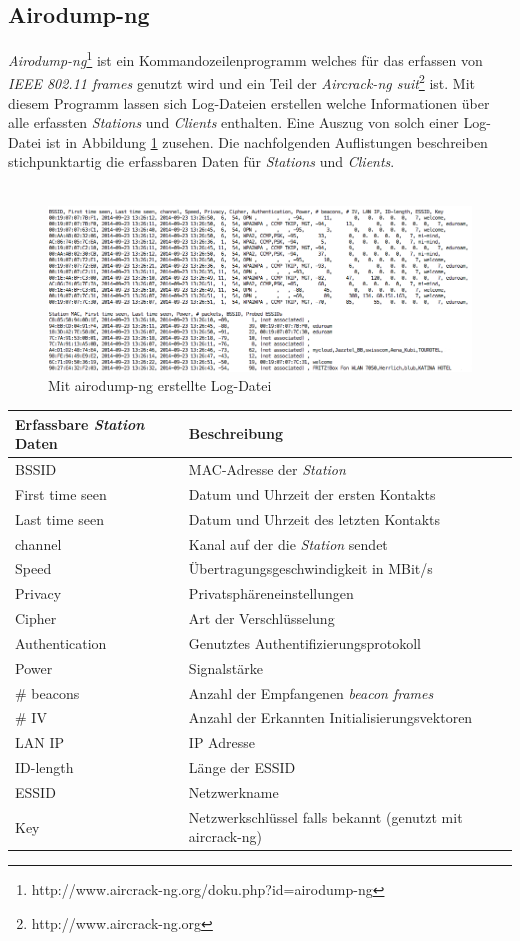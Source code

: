 \documentclass[]{report}
\begin{document}
\subsection{Airodump-ng}\label{lab:airodump-ng}
\textit{Airodump-ng}\footnote{http://www.aircrack-ng.org/doku.php?id=airodump-ng} ist ein Kommandozeilenprogramm welches für das erfassen von \textit{IEEE 802.11 frames} genutzt wird und ein Teil der \textit{Aircrack-ng suit}\footnote{http://www.aircrack-ng.org} ist. Mit diesem Programm lassen sich Log-Dateien erstellen welche Informationen über alle erfassten \textit{Stations} und \textit{Clients} enthalten. Eine Auszug von solch einer Log-Datei ist in Abbildung \ref{fig:log_file} zusehen. Die nachfolgenden Auflistungen beschreiben stichpunktartig die erfassbaren Daten für \textit{Stations} und \textit{Clients}.\\ \\
\begin{figure}
    \centering
    \includegraphics[width=5.0in]{bilder/log.png}
    \caption{Mit airodump-ng erstellte Log-Datei}
    \label{fig:log_file}
\end{figure}
\begin{center}
  \begin{tabulary}{\textwidth}{l | L}
\toprule
Erfassbare \textit{Station} Daten & Beschreibung \\
\midrule
BSSID & MAC-Adresse der \textit{Station} \\
First time seen & Datum und Uhrzeit der ersten Kontakts \\
Last time seen & Datum und Uhrzeit des letzten Kontakts \\
channel &  Kanal auf der die \textit{Station} sendet \\
Speed & Übertragungsgeschwindigkeit in MBit/s\\
Privacy & Privatsphäreneinstellungen \\
Cipher & Art der Verschlüsselung \\
Authentication & Genutztes Authentifizierungsprotokoll \\
Power & Signalstärke \\ 
\# beacons & Anzahl der Empfangenen \textit{beacon frames}\\
\# IV & Anzahl der Erkannten Initialisierungsvektoren \\
LAN IP &  IP Adresse \\
ID-length & Länge der ESSID \\
ESSID & Netzwerkname \\
Key & Netzwerkschlüssel falls bekannt (genutzt mit aircrack-ng) \\
\bottomrule
\end{tabulary}
\end{center} 
\end{document}
